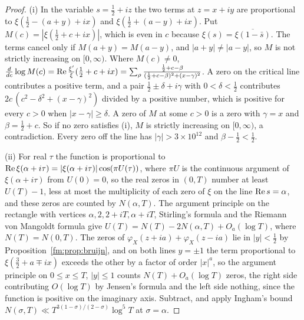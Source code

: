\begin{proof}
(i) In the variable $s=\frac12+iz$ the two terms at $z=x+iy$ are proportional to $\xi(\frac12-(a+y)+ix)$ and $\xi(\frac12+(a-y)+ix)$. Put $M(c)=|\xi(\frac12+c+ix)|$, which is even in $c$ because $\xi(s)=\overline{\xi(1-\bar s)}$. The terms cancel only if $M(a+y)=M(a-y)$, and $|a+y|\ne|a-y|$, so $M$ is not strictly increasing on $[0,\infty)$. Where $M(c)\ne0$, $\frac d{dc}\log M(c)=\operatorname{Re}\frac{\xi'}\xi(\frac12+c+ix)=\sum_\rho\frac{\frac12+c-\beta}{(\frac12+c-\beta)^2+(x-\gamma)^2}$. A zero on the critical line contributes a positive term, and a pair $\frac12\pm\delta+i\gamma$ with $0<\delta<\frac12$ contributes $2c\,(c^2-\delta^2+(x-\gamma)^2)$ divided by a positive number, which is positive for every $c>0$ when $|x-\gamma|\ge\delta$. A zero of $M$ at some $c>0$ is a zero with $\gamma=x$ and $\beta=\frac12+c$. So if no zero satisfies (i), $M$ is strictly increasing on $[0,\infty)$, a contradiction. Every zero off the line has $|\gamma|>3\times10^{12}$ \cite{PT21} and $\beta-\frac12<\frac12$.

(ii) For real $\tau$ the function is proportional to $\operatorname{Re}\xi(\alpha+i\tau)=|\xi(\alpha+i\tau)|\cos(\pi U(\tau))$, where $\pi U$ is the continuous argument of $\xi(\alpha+i\tau)$ from $U(0)=0$, so the real zeros in $(0,T)$ number at least $U(T)-1$, less at most the multiplicity of each zero of $\xi$ on the line $\operatorname{Re} s=\alpha$, and these zeros are counted by $N(\alpha,T)$. The argument principle on the rectangle with vertices $\alpha,2,2+iT,\alpha+iT$, Stirling's formula and the Riemann von Mangoldt formula give $U(T)=N(T)-2N(\alpha,T)+O_a(\log T)$, where $N(T)=N(0,T)$. The zeros of $\varphi_X(z+ia)+\varphi_X(z-ia)$ lie in $|y|<\frac12$ by Proposition~\ref{fm:prop:bruijn}, and on both lines $y=\pm1$ the term proportional to $\xi(\frac32+a\mp ix)$ exceeds the other by a factor of order $|x|^a$, so the argument principle on $0\le x\le T$, $|y|\le1$ counts $N(T)+O_a(\log T)$ zeros, the right side contributing $O(\log T)$ by Jensen's formula and the left side nothing, since the function is positive on the imaginary axis. Subtract, and apply Ingham's bound $N(\sigma,T)\ll T^{3(1-\sigma)/(2-\sigma)}\log^5T$ at $\sigma=\alpha$.
\end{proof}

